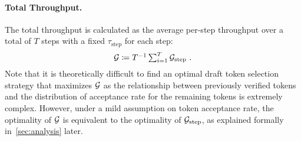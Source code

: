 \paragraph{Total Throughput.} The total throughput is calculated as the average per-step throughput over a total of $T$ steps with a fixed $\tau_{\text{step}}$ for each step:
\begin{equation*}
    \textstyle {\mathcal{G}} \coloneqq T^{-1}\sum_{i=1}^{T} {\mathcal{G}}_{\text{step}}\ .
\end{equation*}
Note that it is theoretically difficult to find an optimal draft token selection strategy that maximizes ${\mathcal{G}}$ as the relationship between previously verified tokens and the distribution of acceptance rate for the remaining tokens is extremely complex. However, under a mild assumption on token acceptance rate, the optimality of ${\mathcal{G}}$ is equivalent to the optimality of ${\mathcal{G}}_{\text{step}}$, as explained formally in~\cref{sec:analysis} later.